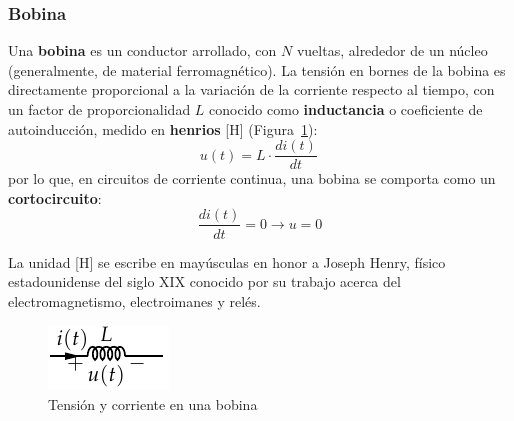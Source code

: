 	\subsubsection{Bobina}\label{sec.bobina}
	
	Una \textbf{bobina} es un conductor arrollado, con $N$ vueltas, alrededor de un núcleo (generalmente, de material ferromagnético). La tensión en bornes de la bobina es directamente proporcional a la variación de la corriente respecto al tiempo, con un factor de proporcionalidad $L$ conocido como \textbf{inductancia} o coeficiente de autoinducción, medido en \textbf{henrios} [H] (Figura~\ref{fig.bobina}):
	\begin{equation}\label{eq.u_L}
		\boxed{u(t)=L\cdot\frac{di(t)}{dt}}\,
	\end{equation}
	por lo que, en circuitos de corriente continua, una bobina se comporta como un \textbf{cortocircuito}:
	\begin{equation*}
		\dfrac{di(t)}{dt} = 0 \rightarrow u = 0
	\end{equation*}
	\begin{remark}
		La unidad [H] se escribe en mayúsculas en honor a Joseph Henry, físico estadounidense del siglo XIX conocido por su trabajo acerca del electromagnetismo, electroimanes y relés.
	\end{remark}
	\begin{figure}[H]
		\centering
		\includegraphics[width=0.15\linewidth]{../figs/Bobina.pdf}
		\caption{Tensión y corriente en una bobina}
		\label{fig.bobina}
	\end{figure}
	
